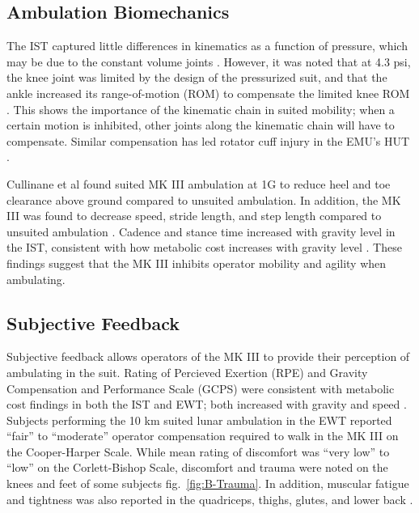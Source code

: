 \documentclass[defaultstyle,11pt]{comps}
\begin{document}
\hypertarget{ambulation-biomechanics}{%
\subsection{Ambulation Biomechanics}\label{ambulation-biomechanics}}

The IST captured little differences in kinematics as a function of pressure, which may be due to the constant volume joints \citep{Norcross2010}.
However, it was noted that at 4.3 psi, the knee joint was limited by the design of the pressurized suit, and that the ankle increased its range-of-motion (ROM) to compensate the limited knee ROM \citep{Norcross2010}.
This shows the importance of the kinematic chain in suited mobility; when a certain motion is inhibited, other joints along the kinematic chain will have to compensate.
Similar compensation has led rotator cuff injury in the EMU's HUT \citep{Williams2003}.

Cullinane et al \citep{Cullinane2017a} found suited MK III ambulation at 1G to reduce heel and toe clearance above ground compared to unsuited ambulation.
In addition, the MK III was found to decrease speed, stride length, and step length compared to unsuited ambulation \citep{Cullinane2017a}.
Cadence and stance time increased with gravity level in the IST, consistent with how metabolic cost increases with gravity level \citep{Norcross2010}.
These findings suggest that the MK III inhibits operator mobility and agility when ambulating.

\hypertarget{subjective-feedback}{%
\subsection{Subjective Feedback}\label{subjective-feedback}}

Subjective feedback allows operators of the MK III to provide their perception of ambulating in the suit.
Rating of Percieved Exertion (RPE) and Gravity Compensation and Performance Scale (GCPS) were consistent with metabolic cost findings in both the IST and EWT; both increased with gravity and speed \citep{Norcross2009, Norcross2010}.
Subjects performing the 10 km suited lunar ambulation in the EWT reported ``fair'' to ``moderate'' operator compensation required to walk in the MK III on the Cooper-Harper Scale\citep{Norcross2009}.
While mean rating of discomfort was ``very low'' to ``low'' on the Corlett-Bishop Scale, discomfort and trauma were noted on the knees and feet of some subjects \citep{Norcross2009} fig.~\ref{fig:B-Trauma}.
In addition, muscular fatigue and tightness was also reported in the quadriceps, thighs, glutes, and lower back \citep{Norcross2009}.
\end{document}
